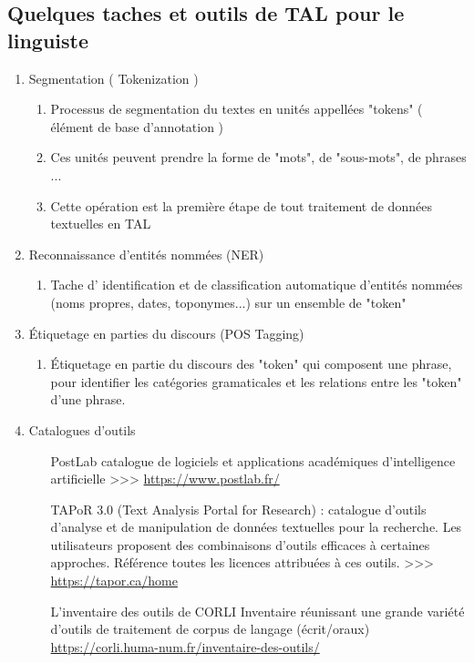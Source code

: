 \documentclass{book}
\begin{document}
\subsection*{Quelques taches et outils de TAL pour le linguiste}
\begin{enumerate}
	\item Segmentation ( Tokenization )
        \begin{enumerate}
            \item Processus de segmentation du textes en unités appellées "tokens" ( élément de base d'annotation )
            \item Ces unités peuvent prendre la forme de "mots", de "sous-mots", de phrases ...
            \item Cette opération est la première étape de tout traitement de données textuelles en TAL
        \end{enumerate}
	\item Reconnaissance d'entités nommées (NER)
        \begin{enumerate}
            \item Tache d' identification et de classification automatique d'entités nommées (noms propres, dates, toponymes...) sur un ensemble de "token"
        \end{enumerate}
	\item Étiquetage en parties du discours (POS Tagging)
        \begin{enumerate}
            \item Étiquetage en partie du discours des "token" qui composent une phrase, pour identifier les catégories gramaticales et les relations entre les "token" d'une phrase.
        \end{enumerate}
    \item Catalogues d'outils 
        \begin{enumerate}
            \item [PostLab] catalogue de logiciels et applications académiques d'intelligence artificielle >>> \url{https://www.postlab.fr/}
            \item [TAPoR 3.0] (Text Analysis Portal for Research) : catalogue d'outils d'analyse et de manipulation de données textuelles pour la recherche. Les utilisateurs proposent des combinaisons d'outils efficaces à certaines approches. Référence toutes les licences attribuées à ces outils. >>> \url{https://tapor.ca/home}
            \item [L'inventaire des outils de CORLI] Inventaire réunissant une grande variété d'outils de traitement de corpus de langage (écrit/oraux) \url{https://corli.huma-num.fr/inventaire-des-outils/}

\end{enumerate}
\end{enumerate}
\end{document}
